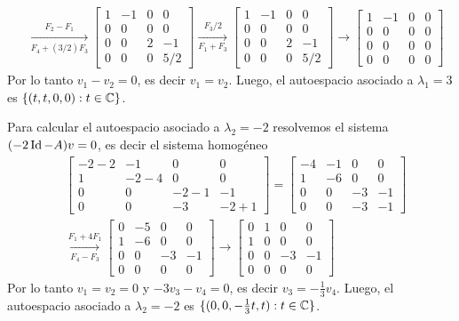 \begin{enumerate}[resume,topsep=6pt,itemsep=.4cm]
\begin{align*}
        & \underset{F_4+(3/2)F_3}{\stackrel{F_2-F_1}{\longrightarrow}} \begin{bmatrix} 1 & -1 & 0 & 0\\ 0 & 0 & 0 & 0\\ 0 & 0 & 2 & -1 \\ 0 & 0 & 0 & 5/2 \end{bmatrix} \underset{F_1+F_3}{\stackrel{F_3/2}{\longrightarrow}} \begin{bmatrix} 1 & -1 & 0 & 0\\ 0 & 0 & 0 & 0\\ 0 & 0 & 2 & -1 \\ 0 & 0 & 0 & 5/2 \end{bmatrix} \longrightarrow\begin{bmatrix} 1 & -1 & 0 & 0\\ 0 & 0 & 0 & 0\\ 0 & 0 & 0 & 0 \\ 0 & 0 & 0 & 0 \end{bmatrix}
    \end{align*}
    Por lo tanto $v_1 - v_2 =0$, es decir $v_1 = v_2$. Luego, el autoespacio asociado a $\lambda_1=3$ es $\{(t,t,0,0): t \in \mathbb C\}$. 

    Para calcular el autoespacio asociado a $\lambda_2=-2$ resolvemos el sistema  $(-2\operatorname{Id}-A)v=0$, es decir el sistema homogéneo
    \begin{align*}
        &\begin{bmatrix} -2-2 & -1 & 0 & 0\\ 1 & -2-4 & 0 & 0\\ 0 & 0 & -2-1 & -1 \\ 0 & 0 & -3 & -2+1\end{bmatrix} =  \begin{bmatrix} -4 & -1 & 0 & 0\\ 1 & -6 & 0 & 0\\ 0 & 0 & -3 & -1 \\ 0 & 0 & -3 & -1 \end{bmatrix} \\
        & \underset{F_4-F_3}{\stackrel{F_1+4F_1}{\longrightarrow}} \begin{bmatrix} 0 & -5 & 0 & 0\\ 1 & -6 & 0 & 0\\ 0 & 0 & -3 & -1 \\ 0 & 0 & 0 & 0 \end{bmatrix} \longrightarrow \begin{bmatrix} 0 & 1 & 0 & 0\\ 1 & 0 & 0 & 0\\ 0 & 0 & -3 & -1 \\ 0 & 0 & 0 & 0 \end{bmatrix}
    \end{align*}
    Por lo tanto $v_1 = v_2 = 0$ y $-3v_3 - v_4 =0$, es decir $v_3 = -\frac13 v_4$. Luego, el autoespacio asociado a $\lambda_2=-2$ es $\{(0,0,-\frac13t,t): t \in \mathbb C\}$.


\end{enumerate}
